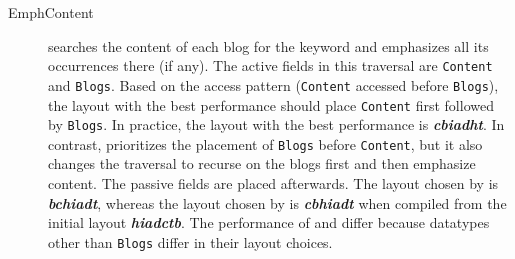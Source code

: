 \begin{description}

\item[EmphContent]
searches the content of each blog for the keyword and emphasizes all its occurrences there (if any).
%
%
The active fields in this traversal are \lstinline{Content} and \lstinline{Blogs}.
Based on the access pattern (\lstinline{Content} accessed before \lstinline{Blogs}),
the layout with the best performance should place \lstinline{Content} first followed by \lstinline{Blogs}.
In practice, the layout with the best performance is \textbf{\textit{cbiadht}}.
In contrast, \systemSolver prioritizes the placement of \lstinline{Blogs} before \lstinline{Content}, but
it also changes the traversal to recurse on the blogs first and then emphasize content.
The passive fields are placed afterwards.
The layout chosen by \systemSolver is \textbf{\textit{bchiadt}}, whereas the layout chosen by \systemGreedy is \textbf{\textit{cbhiadt}} when compiled from the initial layout \textbf{\textit{hiadctb}}.
The performance of \systemGreedy and
\systemSolver differ because datatypes other than \lstinline{Blogs} differ in their layout choices.



\end{description}
